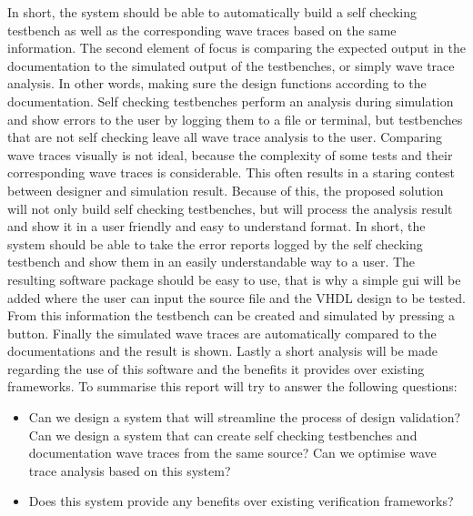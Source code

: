 \npar
In short, the system should be able to automatically build a self checking testbench as well as the corresponding wave traces based on the same information.
\npar
The second element of focus is comparing the expected output in the documentation to the simulated output of the testbenches, or simply wave trace analysis. In other words, making sure the design functions according to the documentation. Self checking testbenches perform an analysis during simulation and show errors to the user by logging them to a file or terminal, but testbenches that are not self checking leave all wave trace analysis to the user. Comparing wave traces visually is not ideal, because the complexity of some tests and their corresponding wave traces is considerable. This often results in a staring contest between designer and simulation result. Because of this, the proposed solution will not only build self checking testbenches, but will process the analysis result and show it in a user friendly and easy to understand format. 
\npar
In short, the system should be able to take the error reports logged by the self checking testbench and show them in an easily understandable way to a user.
\npar
The resulting software package should be easy to use, that is why a simple gui will be added where the user can input the source file and the VHDL design to be tested. From this information the testbench can be created and simulated by pressing a button. Finally the simulated wave traces are automatically compared to the documentations and the result is shown.
\npar
Lastly a short analysis will be made regarding the use of this software and the benefits it provides over existing frameworks.
\newpage
To summarise this report will try to answer the following questions:
\begin{itemize}
	\item Can we design a system that will streamline the process of design validation?
	\subitem Can we design a system that can create self checking testbenches and documentation wave traces from the same source?
	\subitem Can we optimise wave trace analysis based on this system?
	\item Does this system provide any benefits over existing verification frameworks?	
\end{itemize}
